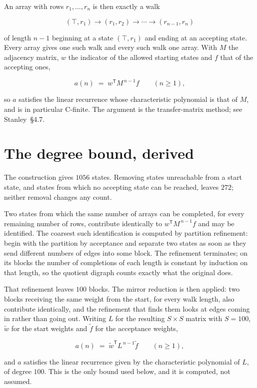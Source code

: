 \documentclass[11pt]{article}
\theoremstyle{definition}
\begin{document}
An array with rows $r_1,\dots,r_n$ is then exactly a walk

\[(\top,r_1) \to (r_1,r_2) \to \cdots \to (r_{n-1},r_n)\]

of length $n-1$ beginning at a state $(\top,r_1)$ and ending at an accepting state. Every array gives one such walk and every such walk one array. With $M$ the adjacency matrix, $w$ the indicator of the allowed starting states and $f$ that of the accepting ones,

\[a(n) \;=\; w^{\mathsf T} M^{\,n-1} f \qquad (n \ge 1),\]

so $a$ satisfies the linear recurrence whose characteristic polynomial is that of $M$, and is in particular C-finite. The argument is the transfer-matrix method; see Stanley~\S4.7.

\section{The degree bound, derived}

The construction gives $1056$ states. Removing states unreachable from a start state, and states from which no accepting state can be reached, leaves $272$; neither removal changes any count.

Two states from which the same number of arrays can be completed, for every remaining number of rows, contribute identically to $w^{\mathsf T}M^{\,n-1}f$ and may be identified. The coarsest such identification is computed by partition refinement: begin with the partition by acceptance and separate two states as soon as they send different numbers of edges into some block. The refinement terminates; on its blocks the number of completions of each length is constant by induction on that length, so the quotient digraph counts exactly what the original does.

That refinement leaves $100$ blocks. The mirror reduction is then applied: two blocks receiving the same weight from the start, for every walk length, also contribute identically, and the refinement that finds them looks at edges coming in rather than going out. Writing $L$ for the resulting $S \times S$ matrix with $S = 100$, $\tilde w$ for the start weights and $\tilde f$ for the acceptance weights,

\[a(n) \;=\; \tilde w^{\mathsf T} L^{\,n-1} \tilde f \qquad (n \ge 1),\]

and $a$ satisfies the linear recurrence given by the characteristic polynomial of $L$, of degree $100$. This is the only bound used below, and it is computed, not assumed.
\end{document}
